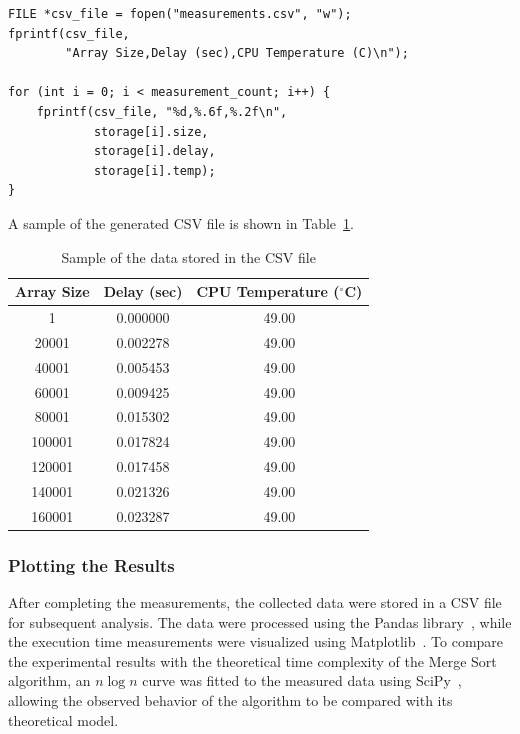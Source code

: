 \documentclass{article}
\begin{document}
\begin{verbatim}
FILE *csv_file = fopen("measurements.csv", "w");
fprintf(csv_file,
        "Array Size,Delay (sec),CPU Temperature (C)\n");

for (int i = 0; i < measurement_count; i++) {
    fprintf(csv_file, "%d,%.6f,%.2f\n",
            storage[i].size,
            storage[i].delay,
            storage[i].temp);
}
\end{verbatim}

A sample of the generated CSV file is shown in Table~\ref{tab:csv_sample}.

\begin{table}
\centering
\caption{Sample of the data stored in the CSV file}
\label{tab:csv_sample}

\begin{tabular}{ccc}
\hline
Array Size & Delay (sec) & CPU Temperature ($^\circ$C) \\
\hline
1      & 0.000000 & 49.00 \\
20001  & 0.002278 & 49.00 \\
40001  & 0.005453 & 49.00 \\
60001  & 0.009425 & 49.00 \\
80001  & 0.015302 & 49.00 \\
100001 & 0.017824 & 49.00 \\
120001 & 0.017458 & 49.00 \\
140001 & 0.021326 & 49.00 \\
160001 & 0.023287 & 49.00 \\
\hline
\end{tabular}

\end{table}

\subsubsection{Plotting the Results}

After completing the measurements, the collected data were stored in a CSV file for subsequent analysis. The data were processed using the Pandas library~\citep{mckinney-proc-scipy-2010,reback2020pandas}, while the execution time measurements were visualized using Matplotlib~\citep{Hunter:2007}. To compare the experimental results with the theoretical time complexity of the Merge Sort algorithm, an \(n\log n\) curve was fitted to the measured data using SciPy~\citep{2020SciPy-NMeth}, allowing the observed behavior of the algorithm to be compared with its theoretical model.
\end{document}
